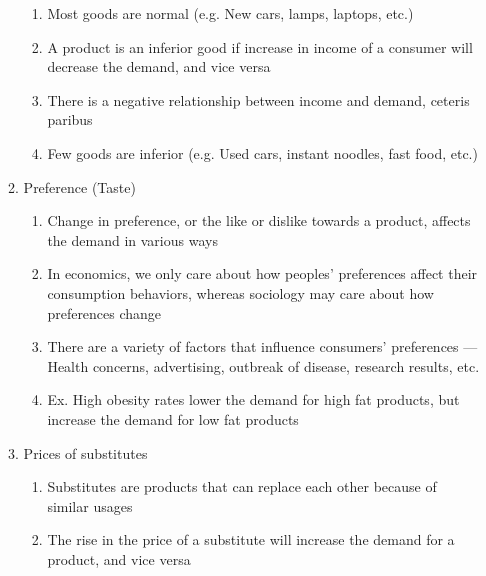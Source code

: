 \documentclass[12pt]{article}
\begin{document}
\begin{enumerate}
\begin{enumerate}
\begin{enumerate}
              \item Most goods are normal (e.g. New cars, lamps, laptops, etc.)

              \item A product is an inferior good if increase in income of a consumer will decrease the demand, and vice versa

              \item There is a negative relationship between income and demand, ceteris paribus

              \item Few goods are inferior (e.g. Used cars, instant noodles, fast food, etc.)

            \end{enumerate}

          \item Preference (Taste)

            \begin{enumerate}

              \item Change in preference, or the like or dislike towards a product, affects the demand in various ways

              \item In economics, we only care about how peoples' preferences affect their consumption behaviors, whereas sociology may care about how preferences change

              \item There are a variety of factors that influence consumers' preferences — Health concerns, advertising, outbreak of disease, research results, etc.

              \item Ex. High obesity rates lower the demand for high fat products, but increase the demand for low fat products

            \end{enumerate}

          \item Prices of substitutes

            \begin{enumerate}

              \item Substitutes are products that can replace each other because of similar usages

              \item The rise in the price of a substitute will increase the demand for a product, and vice versa


\end{enumerate}
\end{enumerate}
\end{enumerate}
\end{document}
